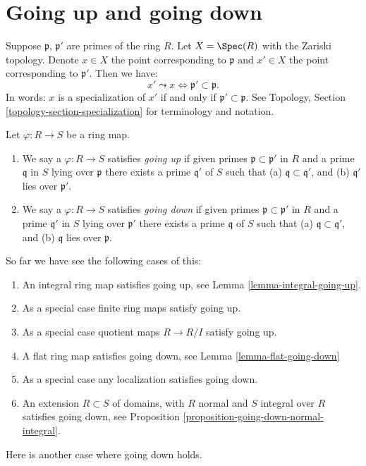 \section{Going up and going down}
\label{section-going-up}

\noindent
Suppose $\mathfrak p$, $\mathfrak p'$ are primes
of the ring $R$. Let $X = \Spec(R)$ with the Zariski
topology. Denote $x \in X$ the point corresponding
to $\mathfrak p$ and $x' \in X$ the point corresponding
to $\mathfrak p'$. Then we have:
$$
x' \leadsto x \Leftrightarrow \mathfrak p' \subset \mathfrak p.
$$
In words: $x$ is a specialization of $x'$ if and
only if $\mathfrak p' \subset \mathfrak p$.
See Topology, Section \ref{topology-section-specialization}
for terminology and notation.

\begin{definition}
\label{definition-going-up-down}
Let $\varphi : R \to S$ be a ring map.
\begin{enumerate}
\item We say a $\varphi : R \to S$ satisfies {\it going up} if
given primes $\mathfrak p \subset \mathfrak p'$ in $R$
and a prime $\mathfrak q$ in $S$ lying over $\mathfrak p$
there exists a prime $\mathfrak q'$ of $S$ such that
(a) $\mathfrak q \subset \mathfrak q'$, and (b)
$\mathfrak q'$ lies over $\mathfrak p'$.
\item We say a $\varphi : R \to S$ satisfies {\it going down} if
given primes $\mathfrak p \subset \mathfrak p'$ in $R$
and a prime $\mathfrak q'$ in $S$ lying over $\mathfrak p'$
there exists a prime $\mathfrak q$ of $S$ such that
(a) $\mathfrak q \subset \mathfrak q'$, and (b)
$\mathfrak q$ lies over $\mathfrak p$.
\end{enumerate}
\end{definition}

\noindent
So far we have see the following cases of this:
\begin{enumerate}
\item An integral ring map satisfies going up, see
Lemma \ref{lemma-integral-going-up}.
\item As a special case finite ring maps satisfy going up.
\item As a special case quotient maps $R \to R/I$ satisfy going up.
\item A flat ring map satisfies going down, see
Lemma \ref{lemma-flat-going-down}
\item As a special case any localization satisfies going down.
\item An extension $R \subset S$ of domains, with $R$ normal
and $S$ integral over $R$ satisfies going down, see
Proposition \ref{proposition-going-down-normal-integral}.
\end{enumerate}
Here is another case where going down holds.

